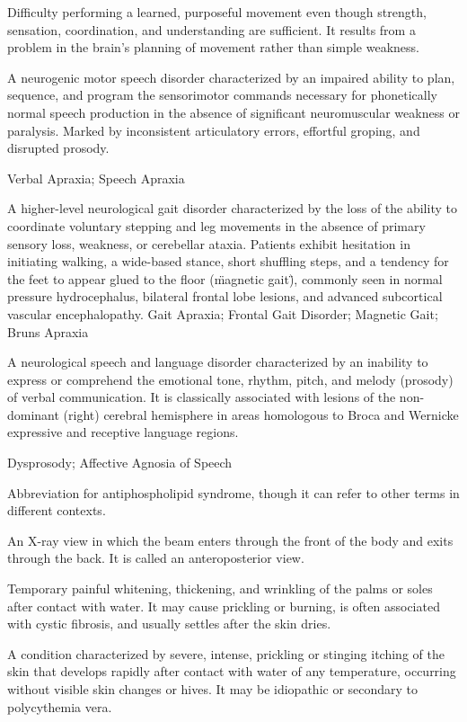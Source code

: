  Difficulty performing a learned, purposeful movement even though strength, sensation, coordination, and understanding are sufficient. It results from a problem in the brain’s planning of movement rather than simple weakness.

 A neurogenic motor speech disorder characterized by an impaired ability to plan, sequence, and program the sensorimotor commands necessary for phonetically normal speech production in the absence of significant neuromuscular weakness or paralysis. Marked by inconsistent articulatory errors, effortful groping, and disrupted prosody.

\synonyms
Verbal Apraxia; Speech Apraxia

 A higher-level neurological gait disorder characterized by the loss of the ability to coordinate voluntary stepping and leg movements in the absence of primary sensory loss, weakness, or cerebellar ataxia. Patients exhibit hesitation in initiating walking, a wide-based stance, short shuffling steps, and a tendency for the feet to appear glued to the floor (\"magnetic gait\"), commonly seen in normal pressure hydrocephalus, bilateral frontal lobe lesions, and advanced subcortical vascular encephalopathy.
\synonyms
Gait Apraxia; Frontal Gait Disorder; Magnetic Gait; Bruns Apraxia

 A neurological speech and language disorder characterized by an inability to express or comprehend the emotional tone, rhythm, pitch, and melody (prosody) of verbal communication. It is classically associated with lesions of the non-dominant (right) cerebral hemisphere in areas homologous to Broca and Wernicke expressive and receptive language regions.

\synonyms
Dysprosody; Affective Agnosia of Speech

 Abbreviation for antiphospholipid syndrome, though it can refer
to other terms in different contexts.

 An X-ray view in which the beam enters through the front of the body and exits through the back. It is called an anteroposterior view.

 Temporary painful whitening, thickening, and wrinkling of the palms or soles after contact with water. It may cause prickling or burning, is often associated with cystic fibrosis, and usually settles after the skin dries.

 A condition characterized by severe, intense, prickling or stinging itching of the skin that develops rapidly after contact with water of any temperature, occurring without visible skin changes or hives. It may be idiopathic or secondary to polycythemia vera.

